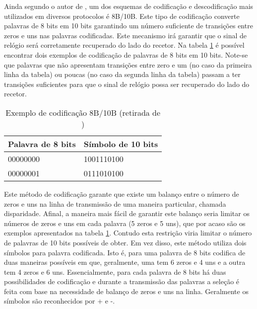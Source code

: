 Ainda segundo o autor de \cite{R032}, um dos esquemas de codificação e descodificação mais utilizados em diversos protocolos é 8B/10B. Este tipo de codificação converte palavras de 8 bits em 10 bits garantindo um número suficiente de transições entre zeros e uns nas palavras codificadas. Este mecanismo irá garantir que o sinal de relógio será corretamente recuperado do lado do recetor. Na tabela \ref{table:cod_8b_10b_ex} é possível encontrar dois exemplos de codificação de palavras de 8 bits em 10 bits. Note-se que palavras que não apresentam transições entre zero e um (no caso da primeira linha da tabela) ou poucas (no caso da segunda linha da tabela) passam a ter transições suficientes para que o sinal de relógio possa ser recuperado do lado do recetor.

\begin{table}[h!]
	\centering
	\caption[Exemplo de codificação 8B/10B]{Exemplo de codificação 8B/10B (retirada de \cite{R032})}
	\label{table:cod_8b_10b_ex}
	\begin{tabular}{@{}ll@{}}
		\toprule
		\multicolumn{1}{c}{\textbf{Palavra de 8 bits}} & \multicolumn{1}{c}{\textbf{Símbolo de 10 bits}} \\ \midrule
		00000000                                       & 1001110100                                      \\
		00000001                                       & 0111010100                                      \\ \bottomrule
	\end{tabular}
	

\end{table}

Este método de codificação garante que existe um balanço entre o número de zeros e uns na linha de transmissão de uma maneira particular, chamada disparidade. Afinal, a maneira mais fácil de garantir este balanço seria limitar os números de zeros e uns em cada palavra (5 zeros e 5 uns), que por acaso são os exemplos apresentados na tabela \ref{table:cod_8b_10b_ex}. Contudo esta restrição viria limitar o número de palavras de 10 bits possíveis de obter. Em vez disso, este método utiliza dois símbolos para palavra codificada. Isto é, para uma palavra de 8 bits codifica de duas maneiras possíveis em que, geralmente, uma tem 6 zeros e 4 uns e a outra tem 4 zeros e 6 uns. Essencialmente, para cada palavra de 8 bits há duas possibilidades de codificação e durante a transmissão das palavras a seleção é feita com base na necessidade de balanço de zeros e uns na linha. Geralmente os símbolos são reconhecidos por + e -.

